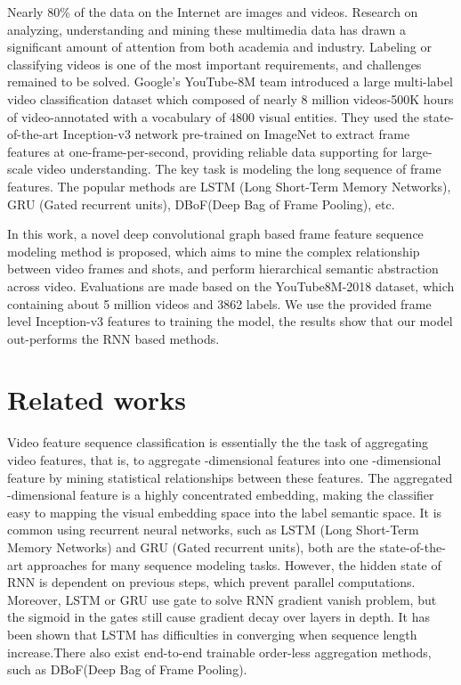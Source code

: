 \documentclass[runningheads]{llncs}
\begin{document}
Nearly 80\% of the data on the Internet are images and videos. Research on analyzing, understanding and mining these multimedia data has drawn a significant amount of attention from both academia and industry. Labeling or classifying videos is one of the most important requirements, and challenges remained to be solved. Google’s YouTube-8M team introduced a large multi-label video classification dataset which composed of nearly 8 million videos-500K hours of video-annotated with a vocabulary of 4800 visual entities\cite{DBLP:journals/corr/Abu-El-HaijaKLN16}. They used the state-of-the-art Inception-v3 network\cite{DBLP:journals/corr/SzegedyVISW15} pre-trained on ImageNet to extract frame features at one-frame-per-second, providing reliable data supporting for large-scale video understanding. The key task is modeling the long sequence of frame features. The popular methods are LSTM (Long Short-Term Memory Networks)\cite{Hochreiter:1997:LSM:265493.264179}, GRU (Gated recurrent units)\cite{DBLP:journals/corr/ChoMGBSB14}, DBoF(Deep Bag of Frame Pooling)\cite{DBLP:journals/corr/Abu-El-HaijaKLN16}, etc.

In this work, a novel deep convolutional graph based frame feature sequence modeling method is proposed, which aims to mine the complex relationship between video frames and shots, and perform hierarchical semantic abstraction across video. Evaluations are made based on the YouTube8M-2018 dataset, which containing about 5 million videos and 3862 labels. We use the provided frame level Inception-v3 features to training the model, the results show that our model out-performs the RNN based methods.

\section{Related works}

Video feature sequence classification is essentially the the task of aggregating video features, that is, to aggregate  -dimensional features into one -dimensional feature by mining statistical relationships between these  features. The aggregated -dimensional feature is a highly concentrated embedding, making the classifier easy to mapping the visual embedding space into the label semantic space. It is common using recurrent neural networks, such as LSTM (Long Short-Term Memory Networks)\cite{Hochreiter:1997:LSM:265493.264179}\cite{srivastava2015unsupervised}\cite{yue2015beyond} and GRU (Gated recurrent units)\cite{DBLP:journals/corr/ChoMGBSB14}\cite{ballas2015delving}, both are the state-of-the-art approaches for many sequence modeling tasks. However, the hidden state of RNN is dependent on previous steps, which prevent parallel computations. Moreover, LSTM or GRU use gate to solve RNN gradient vanish problem, but the sigmoid in the gates still cause gradient decay over layers in depth. It has been shown that LSTM has difficulties in converging when sequence length increase\cite{DBLP:journals/corr/abs-1803-04831}.There also exist end-to-end trainable order-less aggregation methods, such as DBoF(Deep Bag of Frame Pooling)\cite{DBLP:journals/corr/Abu-El-HaijaKLN16}.
\end{document}

